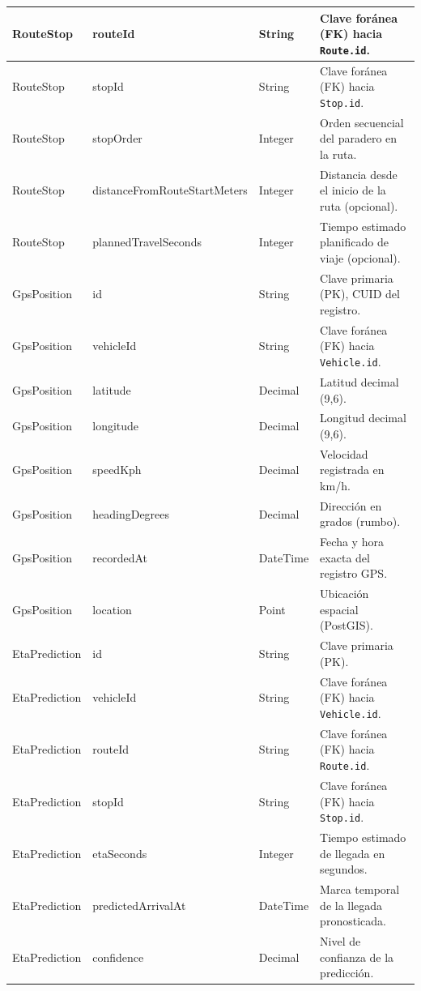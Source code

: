 \begin{longtable}{|p{}|p{}|p{}|p{}|}
\hline
RouteStop & routeId & String & Clave foránea (FK) hacia \texttt{Route.id}. \\
\hline
RouteStop & stopId & String & Clave foránea (FK) hacia \texttt{Stop.id}. \\
\hline
RouteStop & stopOrder & Integer & Orden secuencial del paradero en la ruta. \\
\hline
RouteStop & distanceFromRouteStartMeters & Integer & Distancia desde el inicio de la ruta (opcional). \\
\hline
RouteStop & plannedTravelSeconds & Integer & Tiempo estimado planificado de viaje (opcional). \\
\hline
GpsPosition & id & String & Clave primaria (PK), CUID del registro. \\
\hline
GpsPosition & vehicleId & String & Clave foránea (FK) hacia \texttt{Vehicle.id}. \\
\hline
GpsPosition & latitude & Decimal & Latitud decimal (9,6). \\
\hline
GpsPosition & longitude & Decimal & Longitud decimal (9,6). \\
\hline
GpsPosition & speedKph & Decimal & Velocidad registrada en km/h. \\
\hline
GpsPosition & headingDegrees & Decimal & Dirección en grados (rumbo). \\
\hline
GpsPosition & recordedAt & DateTime & Fecha y hora exacta del registro GPS. \\
\hline
GpsPosition & location & Point & Ubicación espacial (PostGIS). \\
\hline
EtaPrediction & id & String & Clave primaria (PK). \\
\hline
EtaPrediction & vehicleId & String & Clave foránea (FK) hacia \texttt{Vehicle.id}. \\
\hline
EtaPrediction & routeId & String & Clave foránea (FK) hacia \texttt{Route.id}. \\
\hline
EtaPrediction & stopId & String & Clave foránea (FK) hacia \texttt{Stop.id}. \\
\hline
EtaPrediction & etaSeconds & Integer & Tiempo estimado de llegada en segundos. \\
\hline
EtaPrediction & predictedArrivalAt & DateTime & Marca temporal de la llegada pronosticada. \\
\hline
EtaPrediction & confidence & Decimal & Nivel de confianza de la predicción. \\
\hline
\end{longtable}

